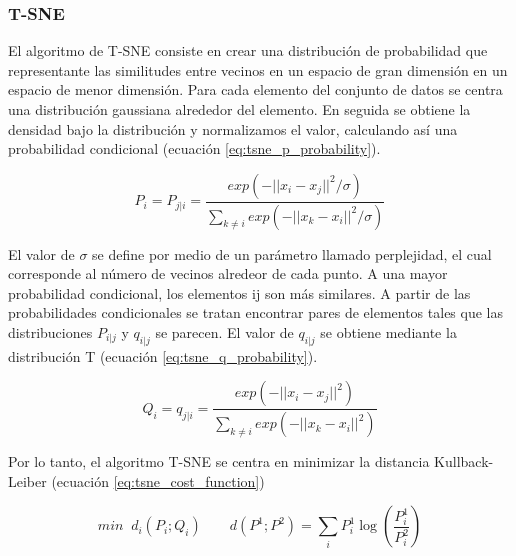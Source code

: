 \subsubsection{T-SNE}

El algoritmo de T-SNE consiste en crear una distribución de probabilidad que representante las similitudes entre vecinos en un espacio de gran dimensión en un espacio de menor dimensión. Para cada elemento del conjunto de datos se centra una distribución gaussiana alrededor del elemento. En seguida se obtiene la densidad bajo la distribución y normalizamos el valor, calculando así una probabilidad condicional (ecuación \ref{eq:tsne_p_probability}).

\begin{equation}
    P_i=P_{j|i} = \frac{exp(-||x_i-x_j||^2/\sigma)}{\sum\limits_{k\neq i} exp(-||x_k-x_i||^2/\sigma)} \label{eq:tsne_p_probability}
\end{equation}

El valor de $\sigma$ se define por medio de un parámetro llamado perplejidad, el cual corresponde al número de vecinos alredeor de cada punto. A una mayor probabilidad condicional, los elementos ij son más similares. A partir de las probabilidades condicionales se tratan encontrar pares de elementos tales que las distribuciones $P_{i|j}$ y $q_{i|j}$ se parecen. El valor de $q_{i|j}$ se obtiene mediante la distribución T (ecuación \ref{eq:tsne_q_probability}).

\begin{equation}
    Q_i=q_{j|i} = \frac{exp(-||x_i-x_j||^2)}{\sum\limits_{k\neq i} exp(-||x_k-x_i||^2)} \label{eq:tsne_q_probability}
\end{equation}

Por lo tanto, el algoritmo T-SNE se centra en minimizar la distancia Kullback-Leiber (ecuación \ref{eq:tsne_cost_function})

\begin{equation}
    min\;\; d_i (P_i;Q_i) \qquad d(P^1;P^2) = \sum_i P_i^1 \log \left(\frac{P^1_i}{P^2_i} \right)
    \label{eq:tsne_cost_function}
\end{equation}